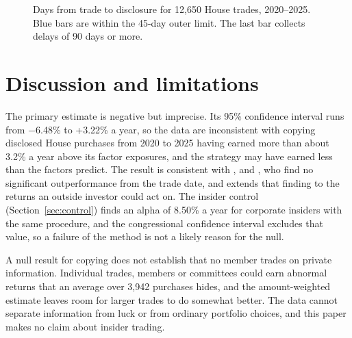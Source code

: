 \documentclass[11pt]{article}
\newcommand{\m}{\ensuremath{-}}
\begin{document}
\begin{figure}[t]
\centering

\caption{Days from trade to disclosure for 12,650 House trades, 2020--2025. Blue bars are within the 45-day outer limit. The last bar collects delays of 90 days or more.}\label{fig:lag}
\end{figure}

\section{Discussion and limitations}\label{sec:discussion}

The primary estimate is negative but imprecise. Its 95\% confidence interval runs from \m6.48\% to +3.22\% a year, so the data are inconsistent with copying disclosed House purchases from 2020 to 2025 having earned more than about 3.2\% a year above its factor exposures, and the strategy may have earned less than the factors predict. The result is consistent with \citet{eggers2013capitol}, \citet{belmont2020relief} and \citet{fischer2025democracy}, who find no significant outperformance from the trade date, and extends that finding to the returns an outside investor could act on. The insider control (Section~\ref{sec:control}) finds an alpha of 8.50\% a year for corporate insiders with the same procedure, and the congressional confidence interval excludes that value, so a failure of the method is not a likely reason for the null.

A null result for copying does not establish that no member trades on private information. Individual trades, members or committees could earn abnormal returns that an average over 3,942 purchases hides, and the amount-weighted estimate leaves room for larger trades to do somewhat better. The data cannot separate information from luck or from ordinary portfolio choices, and this paper makes no claim about insider trading.
\end{document}
